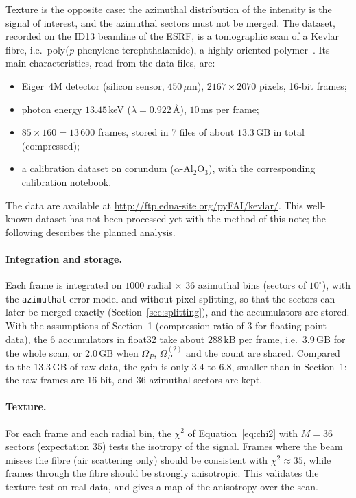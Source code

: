 \documentclass[a4paper,11pt]{article}
\newcommand{\Om}{\Omega}
\newcommand{\OmS}{\Omega^{(2)}}
\begin{document}
Texture is the opposite case: the azimuthal distribution of the intensity is the signal of interest,
and the azimuthal sectors must not be merged. The dataset, recorded on the ID13
beamline of the ESRF, is a tomographic scan of a Kevlar fibre, i.e.\ poly(\emph{p}-phenylene
terephthalamide), a highly oriented polymer~\cite{Northolt74}. Its main characteristics, read from the
data files, are:
\begin{itemize}
\item Eiger~4M detector (silicon sensor, $450\,\mu$m), $2167\times2070$ pixels, 16-bit frames;
\item photon energy $13.45$\,keV ($\lambda=0.922$\,\AA), $10$\,ms per frame;
\item $85\times160 = 13\,600$ frames, stored in 7 files of about $13.3$\,GB in total (compressed);
\item a calibration dataset on corundum ($\alpha$-Al$_2$O$_3$), with the corresponding calibration notebook.
\end{itemize}
The data are available at \url{http://ftp.edna-site.org/pyFAI/kevlar/}. This well-known dataset has not
been processed yet with the method of this note; the following describes the planned analysis.

\paragraph{Integration and storage.} Each frame is integrated on $1000$ radial $\times$ $36$ azimuthal
bins (sectors of $10^\circ$), with the \texttt{azimuthal} error model and without pixel splitting, so
that the sectors can later be merged exactly (Section~\ref{sec:splitting}), and the accumulators are stored.
With the assumptions of Section~1 (compression ratio of 3 for floating-point data), the 6 accumulators
in float32 take about $288$\,kB per frame, i.e.\ $3.9$\,GB for the whole scan, or $2.0$\,GB when
$\Om_P$, $\OmS_P$ and the count are shared. Compared to the $13.3$\,GB of raw data, the gain is only 3.4 to
6.8, smaller than in Section~1: the raw frames are 16-bit, and 36 azimuthal sectors are kept.

\paragraph{Texture.} For each frame and each radial bin, the $\chi^2$ of Equation~\eqref{eq:chi2} with
$M=36$ sectors (expectation $35$) tests the isotropy of the signal. Frames where the beam misses the
fibre (air scattering only) should be consistent with $\chi^2\approx35$, while frames through the fibre
should be strongly anisotropic. This validates the texture test on real data, and gives a map of the
anisotropy over the scan.
\end{document}
